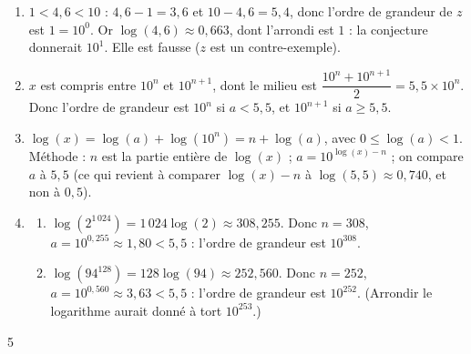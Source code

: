 {\begin{enumerate}
\begin{enumerate}[label=\alph*.]
  \item $\log(27{,}6)\approx1{,}441$ et $\log(812)\approx2{,}910$. Les arrondis à l'unité sont $1$ et $3$ : conjecture « l'ordre de grandeur de $x$ est $10^{k}$, où $k$ est l'arrondi à l'unité de $\log(x)$ ».
  \end{enumerate}
\item $1<4{,}6<10$ : $4{,}6-1=3{,}6$ et $10-4{,}6=5{,}4$, donc l'ordre de grandeur de $z$ est $1=10^0$. Or $\log(4{,}6)\approx0{,}663$, dont l'arrondi est $1$ : la conjecture donnerait $10^1$. Elle est fausse ($z$ est un contre-exemple).
\item $x$ est compris entre $10^n$ et $10^{n+1}$, dont le milieu est $\dfrac{10^n+10^{n+1}}2=5{,}5\times10^n$. Donc l'ordre de grandeur est $10^n$ si $a<5{,}5$, et $10^{n+1}$ si $a\geqslant5{,}5$.
\item $\log(x)=\log(a)+\log(10^n)=n+\log(a)$, avec $0\leqslant\log(a)<1$. Méthode : $n$ est la partie entière de $\log(x)$ ; $a=10^{\log(x)-n}$ ; on compare $a$ à $5{,}5$ (ce qui revient à comparer $\log(x)-n$ à $\log(5{,}5)\approx0{,}740$, et non à $0{,}5$).
\item
  \begin{enumerate}[label=\alph*.]
  \item $\log(2^{1\,024})=1\,024\log(2)\approx308{,}255$. Donc $n=308$, $a=10^{0{,}255}\approx1{,}80<5{,}5$ : l'ordre de grandeur est $10^{308}$.
  \item $\log(94^{128})=128\log(94)\approx252{,}560$. Donc $n=252$, $a=10^{0{,}560}\approx3{,}63<5{,}5$ : l'ordre de grandeur est $10^{252}$. (Arrondir le logarithme aurait donné à tort $10^{253}$.)
  \end{enumerate}
\end{enumerate}
}{5}

